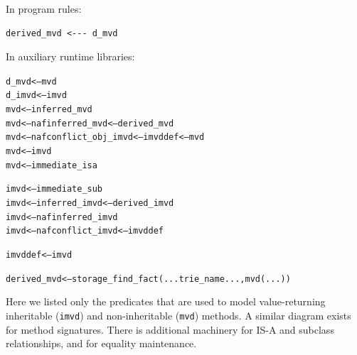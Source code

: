 \documentclass[11pt]{article}
\newcommand{\RULELOGNAF}{{{\tt naf}}\xspace}
\begin{document}
\noindent
In program rules:
\begin{verbatim}
derived_mvd <--- d_mvd  
\end{verbatim}
\noindent
In auxiliary runtime libraries:
\begin{alltt}
d_mvd  <---  mvd
d_imvd <--- imvd
          mvd <---      inferred_mvd
          mvd <--- \RULELOGNAF inferred_mvd        <--- derived_mvd
          mvd <--- \RULELOGNAF conflict_obj_imvd   <--- imvddef <--- mvd
          mvd <---      imvd
          mvd <---      immediate_isa

         imvd <---      immediate_sub
         imvd <---      inferred_imvd             <--- derived_imvd
         imvd <--- \RULELOGNAF inferred_imvd
         imvd <--- \RULELOGNAF conflict_imvd      <--- imvddef

      imvddef <---      imvd

  derived_mvd <--- storage_find_fact(...trie_name..., mvd(...))
\end{alltt}
Here we listed only the predicates that are used to model value-returning
inheritable ({\tt imvd}) and non-inheritable ({\tt mvd}) methods.  A similar
diagram exists for
method signatures. There is additional machinery for
IS-A and subclass relationships, and for equality maintenance.
\end{document}
